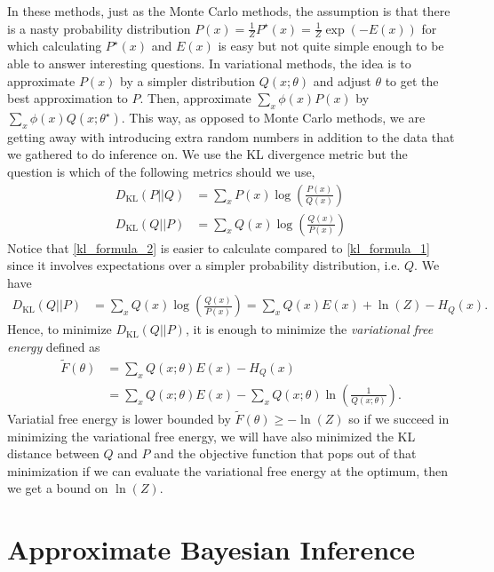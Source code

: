\documentclass[10pt ]{article}
\begin{document}
In these methods, just as the Monte Carlo methods, the assumption is that there is a nasty probability distribution $P(x) = \frac{1}{Z} P^{\star}(x) =  \frac{1}{Z}  \exp(-E(x))$ for which calculating $P^{\star}(x) $ and $E(x)$ is easy but not quite simple enough to be able to answer interesting questions. In variational methods, the idea is to approximate $P(x)$ by a simpler distribution $Q(x;\theta)$ and adjust $\theta$ to get the best approximation to $P$. Then, approximate $\sum_x \phi(x) P(x)$ by $\sum_x \phi(x) Q(x; \theta^{\star})$. This way, as opposed to Monte Carlo methods, we are getting away with introducing extra random numbers in addition to the data that we gathered to do inference on. We use the KL divergence metric but the question is which of the following metrics should we use,
\begin{align}
\label{kl_formula_1}
D_{\mathrm{KL}}(P || Q) &=  \sum_{x} P(x)  \log \left( \frac{P(x)}{Q(x)}\right) \\
D_{\mathrm{KL}}(Q || P) &=  \sum_{x} Q(x)  \log \left( \frac{Q(x)}{P(x)}\right) 
\label{kl_formula_2}
\end{align}
Notice that \eqref{kl_formula_2} is easier to calculate compared to \eqref{kl_formula_1} since it involves expectations over a simpler probability distribution, i.e. $Q$. We have
\begin{align}
D_{\mathrm{KL}}(Q || P) &=  \sum_{x} Q(x)  \log \left( \frac{Q(x)}{P(x)}\right) = \sum_{x} Q(x) E(x) + \ln(Z) - H_Q(x).
\label{kl_formula_3}
\end{align}
Hence, to minimize $D_{\mathrm{KL}}(Q || P)$, it is enough to minimize the {\em variational free energy} defined as 
\begin{align}
\tilde{F}(\theta) &=  \sum_{x} Q(x; \theta) E(x)  - H_Q(x) \nonumber \\
&= \sum_{x} Q(x; \theta) E(x)  - \sum_{x}  Q(x; \theta) \ln \left( \frac{1}{Q(x; \theta)} \right).
\label{eq_var_free_energy}
\end{align}
Variatial free energy is lower bounded by $\tilde{F}(\theta) \ge - \ln (Z)$ so if we succeed in minimizing the variational free energy, we will have also minimized the KL distance between $Q$ and $P$ and the objective function that pops out of that minimization if we can evaluate the variational free energy at the optimum, then we get a bound on $\ln(Z)$.

\section{Approximate Bayesian Inference}
\end{document}
